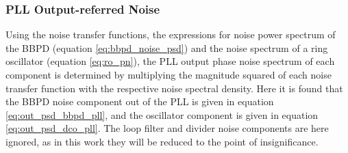 	\subsubsection{PLL Output-referred Noise}\label{sec:pll_output_noise}
		Using the noise transfer functions, the expressions for noise power spectrum of the BBPD (equation \ref{eq:bbpd_noise_psd}) and the noise spectrum of a ring oscillator (equation \ref{eq:ro_pn}), the PLL output phase noise spectrum of each component is determined by multiplying the magnitude squared of each noise transfer function with the respective noise spectral density. Here it is found that the BBPD noise component out of the PLL is given in equation \ref{eq:out_psd_bbpd_pll}, and the oscillator component is given in equation \ref{eq:out_psd_dco_pll}. The loop filter and divider noise components are here ignored, as in this work they will be reduced to the point of insignificance.

